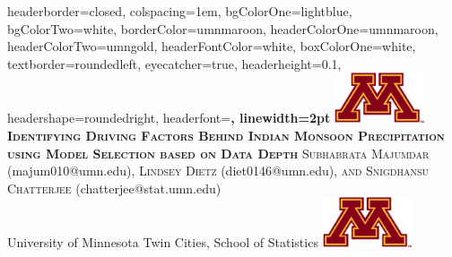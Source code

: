 \documentclass[landscape,a0paper,fontscale=0.3]{baposter} %
\begin{document}
\begin{poster}
{
headerborder=closed, %
colspacing=1em, %
bgColorOne=lightblue, %
bgColorTwo=white, %
borderColor=umnmaroon, %
headerColorOne=umnmaroon, %
headerColorTwo=umngold, %
headerFontColor=white, %
boxColorOne=white, %
textborder=roundedleft, %
eyecatcher=true, %
headerheight=0.1\textheight, %
headershape=roundedright, %
headerfont=\Large\bf\textsc, %
linewidth=2pt %
}
%
{\includegraphics[height=4em]{umnlogo1}} %
{\huge{\bf\textsc{Identifying Driving Factors Behind Indian Monsoon Precipitation using Model Selection based on Data Depth}}
\vspace{0.1em}} %
{\large \textsc{Subhabrata Majumdar} (majum010@umn.edu), \textsc{Lindsey Dietz} (diet0146@umn.edu),
\textsc{ and Snigdhansu Chatterjee} (chatterjee@stat.umn.edu)
\\University of Minnesota Twin Cities, School of Statistics}
{\includegraphics[height=4em]{umnlogo1}} %
\vspace{.1em}


\end{poster}
\end{document}

